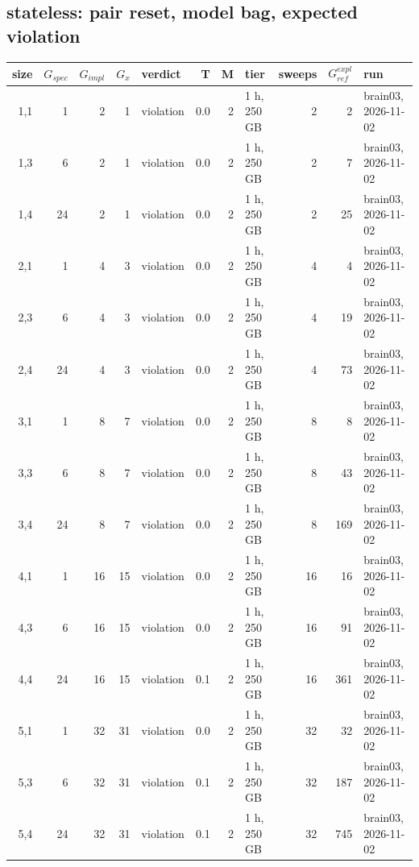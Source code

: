\documentclass[10pt]{article}
\begin{document}
\subsection*{stateless: pair \textsf{reset}, model bag, expected violation}
\begin{longtable}{@{}rrrrlrrlrrl@{}}
\toprule
size & $G_{\mathit{spec}}$ & $G_{\mathit{impl}}$ & $G_x$ & verdict & T & M & tier & sweeps & $G_{\mathit{ref}}^{\mathit{expl}}$ & run \\
\midrule
\endhead
\color{blue} 1,1 & 1 & 2 & 1 & violation & 0.0 & 2 & 1 h, 250 GB & 2 & 2 & brain03, 2026-11-02 \\
\color{blue} 1,3 & 6 & 2 & 1 & violation & 0.0 & 2 & 1 h, 250 GB & 2 & 7 & brain03, 2026-11-02 \\
\color{blue} 1,4 & 24 & 2 & 1 & violation & 0.0 & 2 & 1 h, 250 GB & 2 & 25 & brain03, 2026-11-02 \\
\color{blue} 2,1 & 1 & 4 & 3 & violation & 0.0 & 2 & 1 h, 250 GB & 4 & 4 & brain03, 2026-11-02 \\
\color{blue} 2,3 & 6 & 4 & 3 & violation & 0.0 & 2 & 1 h, 250 GB & 4 & 19 & brain03, 2026-11-02 \\
\color{blue} 2,4 & 24 & 4 & 3 & violation & 0.0 & 2 & 1 h, 250 GB & 4 & 73 & brain03, 2026-11-02 \\
\color{blue} 3,1 & 1 & 8 & 7 & violation & 0.0 & 2 & 1 h, 250 GB & 8 & 8 & brain03, 2026-11-02 \\
\color{blue} 3,3 & 6 & 8 & 7 & violation & 0.0 & 2 & 1 h, 250 GB & 8 & 43 & brain03, 2026-11-02 \\
\color{blue} 3,4 & 24 & 8 & 7 & violation & 0.0 & 2 & 1 h, 250 GB & 8 & 169 & brain03, 2026-11-02 \\
\color{blue} 4,1 & 1 & 16 & 15 & violation & 0.0 & 2 & 1 h, 250 GB & 16 & 16 & brain03, 2026-11-02 \\
\color{blue} 4,3 & 6 & 16 & 15 & violation & 0.0 & 2 & 1 h, 250 GB & 16 & 91 & brain03, 2026-11-02 \\
\color{blue} 4,4 & 24 & 16 & 15 & violation & 0.1 & 2 & 1 h, 250 GB & 16 & 361 & brain03, 2026-11-02 \\
\color{blue} 5,1 & 1 & 32 & 31 & violation & 0.0 & 2 & 1 h, 250 GB & 32 & 32 & brain03, 2026-11-02 \\
\color{blue} 5,3 & 6 & 32 & 31 & violation & 0.1 & 2 & 1 h, 250 GB & 32 & 187 & brain03, 2026-11-02 \\
\color{blue} 5,4 & 24 & 32 & 31 & violation & 0.1 & 2 & 1 h, 250 GB & 32 & 745 & brain03, 2026-11-02 \\

\end{longtable}
\end{document}
